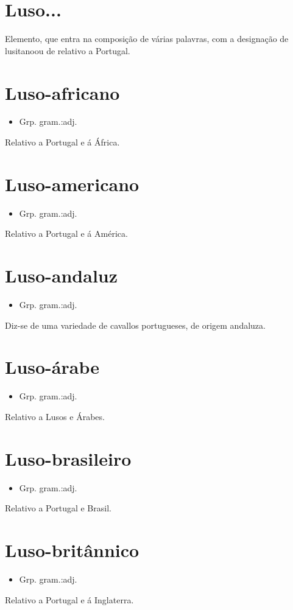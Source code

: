 \section{Luso...}
Elemento, que entra na composição de várias palavras, com a designação de \textunderscore lusitano\textunderscore  ou de \textunderscore relativo a Portugal\textunderscore .
\section{Luso-africano}
\begin{itemize}
\item {Grp. gram.:adj.}
\end{itemize}
Relativo a Portugal e á África.
\section{Luso-americano}
\begin{itemize}
\item {Grp. gram.:adj.}
\end{itemize}
Relativo a Portugal e á América.
\section{Luso-andaluz}
\begin{itemize}
\item {Grp. gram.:adj.}
\end{itemize}
Diz-se de uma variedade de cavallos portugueses, de origem andaluza.
\section{Luso-árabe}
\begin{itemize}
\item {Grp. gram.:adj.}
\end{itemize}
Relativo a Lusos e Árabes.
\section{Luso-brasileiro}
\begin{itemize}
\item {Grp. gram.:adj.}
\end{itemize}
Relativo a Portugal e Brasil.
\section{Luso-britânnico}
\begin{itemize}
\item {Grp. gram.:adj.}
\end{itemize}
Relativo a Portugal e á Inglaterra.
